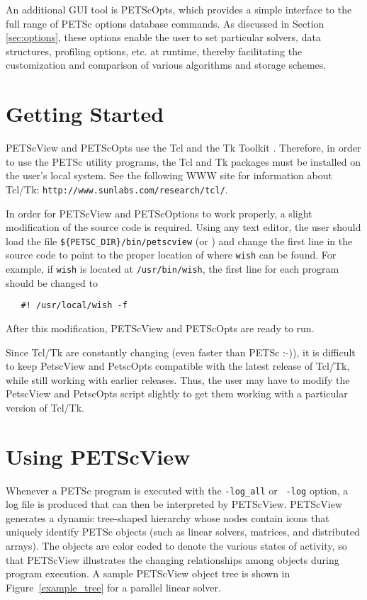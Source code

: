 {An additional GUI tool is PETScOpts, which provides a simple interface to
the full range of PETSc options database commands.  As discussed in Section
\ref{sec:options}, these options enable the user to set particular
solvers, data structures, profiling options, etc. at runtime, thereby
facilitating the customization and comparison of various algorithms
and storage schemes.

\section{Getting Started}

PETScView and PETScOpts use the Tcl and the Tk Toolkit
\cite{tcl-tk-web-page}.  Therefore, in order to use the PETSc utility
programs, the Tcl and Tk packages must be installed on the user's
local system.  See the following WWW site for information about
Tcl/Tk: {\tt http://www.sunlabs.com/research/tcl/}.

In order for PETScView and PETScOptions to work properly, a
slight modification of the source code is required.  Using any text
editor, the user should load the file {\tt \$\{PETSC\_DIR\}/bin/petscview} (or 
) and change the
first line in the source code to point to the proper location of where
{\tt wish} can be found.  For example, if {\tt wish} is located at
{\tt /usr/bin/wish}, the first line for each program should be changed
to
\begin{verbatim}
   #! /usr/local/wish -f
\end{verbatim}
After this modification, PETScView and PETScOpts are ready to run.

\medskip \medskip
Since Tcl/Tk are constantly changing (even faster than PETSc :-)),
it is difficult to keep PetscView and PetscOpts compatible with the
latest release of Tcl/Tk, while still working with earlier releases.
Thus, the user may have to modify the PetscView and PetscOpts script slightly
to get them working with a particular version of Tcl/Tk.
 
\section{Using PETScView}
\label{sec:petscview}

 
 
Whenever a PETSc program is executed with the {\tt -log\_all} or {\tt
-log} option, a log file is produced that can then be interpreted by
PETScView.  PETScView generates a dynamic tree-shaped hierarchy whose
nodes contain icons that uniquely identify PETSc objects (such as
linear solvers, matrices, and distributed arrays).  The objects are
color coded to denote the various states of activity, so that
PETScView illustrates the changing relationships among objects during
program execution.  A sample PETScView object tree is shown in 
Figure~\ref{example_tree} for a parallel linear solver.

}
